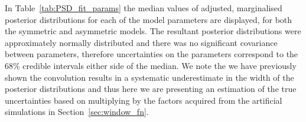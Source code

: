 In Table~\ref{tab:PSD_fit_params} the median values of adjusted, marginalised posterior distributions for each of the model parameters are displayed, for both the symmetric and asymmetric models. The resultant posterior distributions were approximately normally distributed and there was no significant covariance between parameters, therefore uncertainties on the parameters correspond to the $68 \%$ credible intervals either side of the median. We note the we have previously shown the convolution results in a systematic underestimate in the width of the posterior distributions and thus here we are presenting an estimation of the true uncertainties based on multiplying by the factors acquired from the artificial simulations in Section~\ref{sec:window_fn}.


